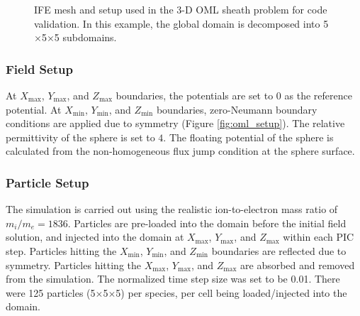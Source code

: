 \documentclass{siamart171218}
\newcommand{\X}{$\times$}
\begin{document}
\begin{figure}[ht!]
\centering
\begin{subfigmatrix}{2} %
\end{subfigmatrix}
\caption{%
IFE mesh and setup used in the 3-D OML sheath problem for code validation.
In this example, the global domain is decomposed into
5$\times$5$\times$5 subdomains.
}
\label{fig:oml_mesh_setup}
\end{figure}

\subsubsection{Field Setup}
At $X_{\max}$, $Y_{\max}$, and $Z_{\max}$ boundaries, the potentials are set to $0$
as the reference potential.
At $X_{\min}$, $Y_{\min}$, and $Z_{\min}$ boundaries, zero-Neumann boundary conditions
are applied due to symmetry
(Figure \ref{fig:oml_setup}).
The relative permittivity of the sphere is set to $4$.
The floating potential of the sphere
is calculated from the non-homogeneous flux jump condition at the sphere surface.

\subsubsection{Particle Setup}
The simulation is carried out using the realistic ion-to-electron mass ratio of
$m_i / m_e = 1836$.
Particles are pre-loaded into the domain before the initial field solution,
and injected into the domain at
$X_{\max}$, $Y_{\max}$, and $Z_{\max}$ within each PIC step.
Particles hitting the $X_{\min}$, $Y_{\min}$, and $Z_{\min}$ boundaries are reflected
due to symmetry.
Particles hitting the $X_{\max}$, $Y_{\max}$, and $Z_{\max}$ are absorbed and removed
from the simulation.
The normalized time step size was set to be 0.01.
There were 125 particles (5\X 5\X 5) per species,
per cell being loaded/injected into the domain.
\end{document}
